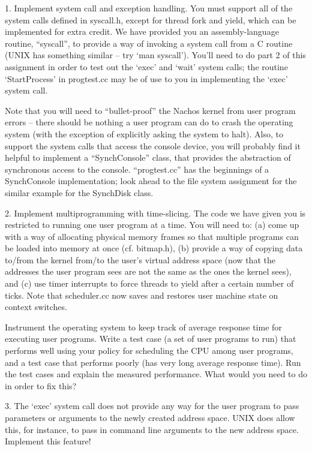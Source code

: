 \begin{description}
\item{1.}
Implement system call and exception handling.  You must
support all of the system calls defined in syscall.h, except
for thread fork and yield, which can be implemented for extra credit.
We have provided you an assembly-language routine, ``syscall'', to
provide a way of invoking a system call from a C routine (UNIX has
something similar -- try `man syscall').   You'll need to do part 2 of
this assignment in order to test out the `exec' and `wait' system calls;
the routine `StartProcess' in progtest.cc may be of use to you in
implementing the `exec' system call.

Note that you will need to ``bullet-proof'' the Nachos kernel from
user program errors -- there should be nothing a user program can
do to crash the operating system (with the exception of explicitly asking
the system to halt).  Also, to support the system calls that access
the console device, you will probably find it helpful to implement
a ``SynchConsole'' class, that provides the abstraction of
synchronous access to the console.  ``progtest.cc'' has the beginnings
of a SynchConsole implementation; look ahead to the file system assignment for
the similar example for the SynchDisk class.

\item{2.}
Implement multiprogramming with time-slicing.  The code we have given
you is restricted to running one user program at a time.
You will need to: (a) come up with a way of allocating physical memory
frames so that multiple programs can be loaded into memory at once
(cf. bitmap.h), (b) provide a way of copying data to/from the kernel
from/to the user's
virtual address space (now that the addresses the user program sees
are not the same as the ones the kernel sees), and (c) use timer interrupts
to force threads to yield after a certain number of ticks.
Note that scheduler.cc now saves and restores user machine state
on context switches.

Instrument the operating system to keep track of average response time
for executing user programs.
Write a test case (a set of user programs to run) that performs well
using your policy for scheduling the CPU among user programs, and a
test case that performs poorly (has very long average response time).
Run the test cases and explain the measured performance.
What would you need to do in order to fix this?

\item{3.} The `exec' system call does not provide any way for the
user program to pass parameters or arguments to the newly created
address space.  UNIX does allow this, for instance, to pass in command
line arguments to the new address space.  Implement this feature!


\end{description}

